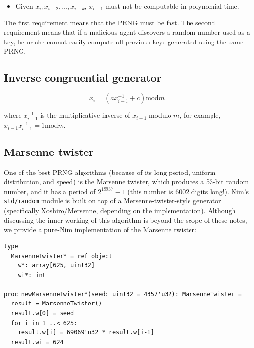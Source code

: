 \documentclass[justified, sixbynine]{tufte-book}
\def\ft{\small\tt}
\theoremstyle{plain}%
\newtheorem * {corollary}{Corollary}
\theoremstyle{definition}
\theoremstyle{remark}
\newtheorem * {remark}{Remark}
\newtheorem * {note}{Note}
\begin{document}
\begin{fullwidth}
\begin{itemize}
\item  Given $x_i, x_{i-2}, ..., x_{i-k}$, $x_{i-1}$ must not be computable in
polynomial time.
\end{itemize}

The first requirement means that the PRNG must be fast. The second
requirement means that if a malicious agent discovers a random number used
as a key, he or she cannot easily compute all previous keys generated using the
same PRNG.

\goodbreak\subsection{Inverse congruential generator}

\begin{equation}
x_i=(ax_{i-1}^{-1}+c)\textrm{mod}m
\end{equation}

where $x_{i-1}^{-1}$ is the multiplicative inverse of $x_{i-1}$ modulo $m$, 
for example, $x_{i-1}x_{i-1}^{-1}=1\textrm{mod}m$.


\goodbreak\subsection{Marsenne twister}

One of the best PRNG algorithms (because of its long period, uniform distribution, and speed) is the Marsenne twister, which produces a 53-bit random number, 
and it has a period of $2^{19937}-1$ (this number is 6002 digits long!).
Nim's {\ft std/random} module is built on top of a Mersenne-twister-style generator (specifically Xoshiro/Mersenne, depending on the implementation).
Although discussing the inner working of this algorithm is beyond the scope of these notes, we provide a
pure-Nim implementation of the Marsenne twister:


\begin{lstlisting}[caption={in file: {\ft nlib/randomgen.nim}}]
type
  MarsenneTwister* = ref object
    w*: array[625, uint32]
    wi*: int

proc newMarsenneTwister*(seed: uint32 = 4357'u32): MarsenneTwister =
  result = MarsenneTwister()
  result.w[0] = seed
  for i in 1 ..< 625:
    result.w[i] = 69069'u32 * result.w[i-1]
  result.wi = 624


\end{lstlisting}
\end{fullwidth}
\end{document}

